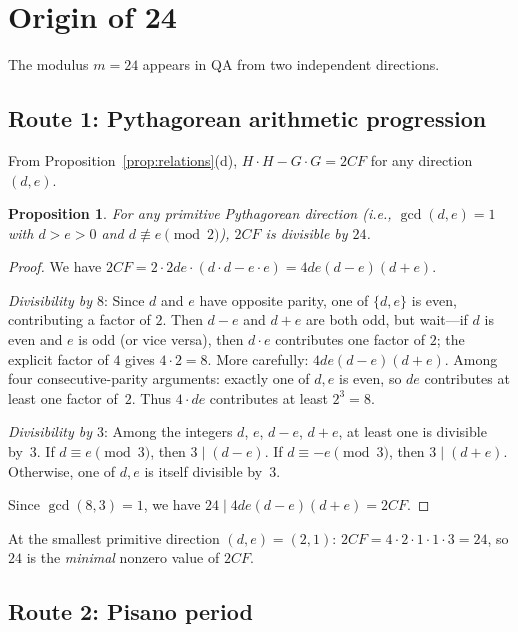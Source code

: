 \documentclass[11pt]{article}
\newtheorem{proposition}[definition]{Proposition}
\begin{document}
\section{Origin of 24}\label{sec:24}

The modulus $m=24$ appears in QA from two independent directions.

\subsection*{Route 1: Pythagorean arithmetic progression}

From Proposition~\ref{prop:relations}(d), $H\cdot H - G\cdot G = 2CF$ for any direction $(d,e)$.

\begin{proposition}\label{prop:div24}
For any primitive Pythagorean direction (i.e., $\gcd(d,e)=1$ with $d > e > 0$ and $d \not\equiv e \pmod{2}$), $2CF$ is divisible by $24$.
\end{proposition}

\begin{proof}
We have $2CF = 2 \cdot 2de \cdot (d\cdot d - e\cdot e) = 4de(d-e)(d+e)$.

\emph{Divisibility by $8$}:  Since $d$ and $e$ have opposite parity, one of $\{d, e\}$ is even, contributing a factor of $2$.  Then $d-e$ and $d+e$ are both odd, but wait---if $d$ is even and $e$ is odd (or vice versa), then $d\cdot e$ contributes one factor of $2$; the explicit factor of $4$ gives $4 \cdot 2 = 8$.  More carefully: $4de(d-e)(d+e)$.  Among four consecutive-parity arguments: exactly one of $d,e$ is even, so $de$ contributes at least one factor of~$2$.  Thus $4 \cdot de$ contributes at least $2^3 = 8$.

\emph{Divisibility by $3$}:  Among the integers $d$, $e$, $d-e$, $d+e$, at least one is divisible by~$3$.  If $d \equiv e \pmod{3}$, then $3 \mid (d-e)$.  If $d \equiv -e \pmod{3}$, then $3 \mid (d+e)$.  Otherwise, one of $d,e$ is itself divisible by~$3$.

Since $\gcd(8,3) = 1$, we have $24 \mid 4de(d-e)(d+e) = 2CF$.
\end{proof}

At the smallest primitive direction $(d,e) = (2,1)$: $2CF = 4 \cdot 2 \cdot 1 \cdot 1 \cdot 3 = 24$, so $24$ is the \emph{minimal} nonzero value of $2CF$.

\subsection*{Route 2: Pisano period}
\end{document}
